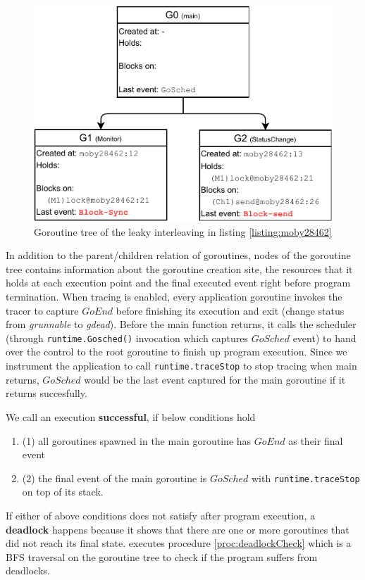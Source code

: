 \begin{figure}[]
\centering
\includegraphics[width=0.75\linewidth]{figs/gtree.pdf}
\caption{Goroutine tree of the leaky interleaving in listing \ref{listing:moby28462}}
\label{fig:gtree}
\end{figure}

%
In addition to the parent/children relation of goroutines, nodes of the goroutine tree contains information about the goroutine creation site, the resources that it holds at each execution point and the final executed event right before program termination.
%
When tracing is enabled, every application goroutine invokes the tracer to capture $GoEnd$ before finishing its execution and exit (\ie change status from \textit{grunnable} to \textit{gdead}\cite{goexit-line-of-code}).
%
Before the main function returns, it calls the scheduler (through \texttt{runtime.Gosched()} invocation which captures $GoSched$ event) to hand over the control to the root goroutine to finish up program execution.
%
Since we instrument the application to call \texttt{runtime.traceStop} to stop tracing when main returns, $GoSched$ would be the last event captured for the main goroutine if it returns succesfully.
%

We call an execution \textbf{successful}, if below conditions hold
\begin{enumerate}
  \item (1) all goroutines spawned in the main goroutine has $GoEnd$ as their final event
  \item (2) the final event of the main goroutine is $GoSched$ with \texttt{runtime.traceStop} on top of its stack.
\end{enumerate}
If either of above conditions does not satisfy after program execution, a \textbf{deadlock} happens because it shows that there are one or more goroutines that did not reach its final state. \goat executes procedure \ref{proc:deadlockCheck} which is a BFS traversal on the goroutine tree to check if the program suffers from deadlocks.

